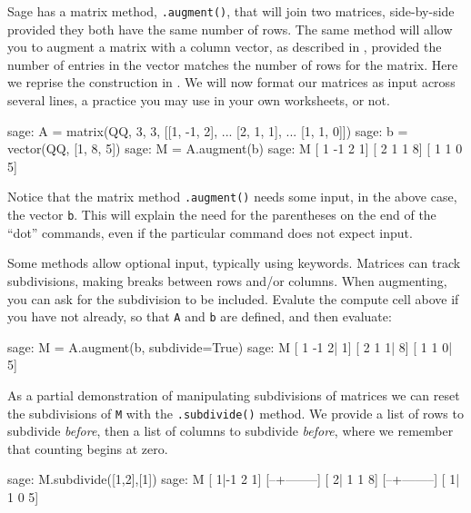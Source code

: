 Sage has a matrix method, \verb?.augment()?, that will join two matrices, side-by-side provided they both have the same number of rows.  The same method will allow you to augment a matrix with a column vector, as described in , provided the number of entries in the vector matches the number of rows for the matrix.  Here we reprise the construction in .  We will now format our matrices as input across several lines, a practice you may use in your own worksheets, or not.
%
\begin{sageexample}
sage: A = matrix(QQ, 3, 3, [[1, -1, 2],
...                         [2,  1, 1],
...                         [1,  1, 0]])
sage: b = vector(QQ, [1, 8, 5])
sage: M = A.augment(b)
sage: M
[ 1 -1  2  1]
[ 2  1  1  8]
[ 1  1  0  5]
\end{sageexample}
%
Notice that the matrix method \verb?.augment()? needs some input, in the above case, the vector \verb?b?.  This will explain the need for the parentheses on the end of the ``dot'' commands, even if the particular command does not expect input.\par
%
Some methods allow optional input, typically using keywords.  Matrices can track subdivisions, making breaks between rows and/or columns.  When augmenting, you can ask for the subdivision to be included.  Evalute the compute cell above if you have not already, so that \verb?A? and \verb?b? are defined, and then evaluate:
%
\begin{sageexample}
sage: M = A.augment(b, subdivide=True)
sage: M
[ 1 -1  2| 1]
[ 2  1  1| 8]
[ 1  1  0| 5]
\end{sageexample}
%
As a partial demonstration of manipulating subdivisions of matrices we can reset the subdivisions of \verb?M? with the \verb?.subdivide()? method.  We provide a list of rows to subdivide \emph{before}, then a list of columns to subdivide \emph{before}, where we remember that counting begins at zero.
%
\begin{sageexample}
sage: M.subdivide([1,2],[1])
sage: M
[ 1|-1  2  1]
[--+--------]
[ 2| 1  1  8]
[--+--------]
[ 1| 1  0  5]
\end{sageexample}
%
\begin{sageverbatim}
\end{sageverbatim}
